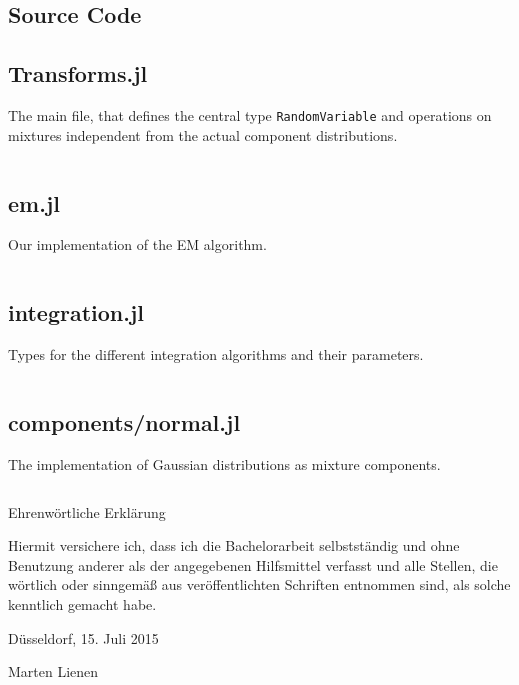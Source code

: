 \documentclass[11pt,a4paper]{book}
\newcommand{\injulia}[1]{\texttt{#1}}
\begin{document}
\begin{appendices}
  \chapter{Source Code}
  \label{ch:source}

  \section{Transforms.jl}

  The main file, that defines the central type \injulia{RandomVariable} and
  operations on mixtures independent from the actual component distributions.

  \inputminted{julia}{src/Transforms.jl}

  \section{em.jl}

  Our implementation of the EM algorithm.

  \inputminted{julia}{src/em.jl}

  \section{integration.jl}

  Types for the different integration algorithms and their parameters.

  \inputminted{julia}{src/integration.jl}

  \section{components/normal.jl}

  The implementation of Gaussian distributions as mixture components.

  \inputminted{julia}{src/components/normal.jl}
\end{appendices}

\printbibliography

\pagestyle{empty}
\cleardoublepage

\vspace*{10em}
{\LARGE Ehrenwörtliche Erklärung}
\vspace{1em}

Hiermit versichere ich, dass ich die Bachelorarbeit selbstständig und ohne
Benutzung anderer als der angegebenen Hilfsmittel verfasst und alle Stellen, die
wörtlich oder sinngemäß aus veröffentlichten Schriften entnommen sind, als
solche kenntlich gemacht habe.

\vspace{5em}

\begin{minipage}{0.4\textwidth}
  \begin{flushleft}
    Düsseldorf, 15. Juli 2015
  \end{flushleft}
\end{minipage}
\hfill
\begin{minipage}{0.4\textwidth}
  \begin{flushright}
    Marten Lienen
  \end{flushright}
\end{minipage}
\end{document}
